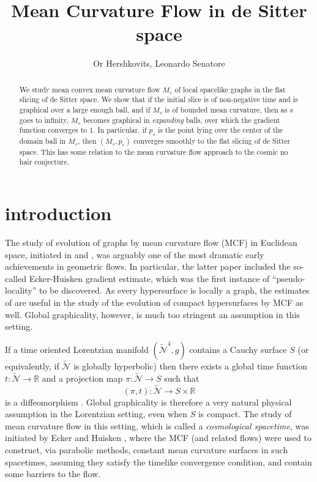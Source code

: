 \documentclass[leqno,11pt]{amsart}
\title[Mean curvature flow in de Sitter space]{Mean Curvature Flow  in de Sitter space}
\author{Or Hershkovits, Leonardo Senatore}
\theoremstyle{definition}
\begin{document}
\begin{abstract}
We study mean convex mean curvature flow $M_s$ of local spacelike graphs in the flat slicing of de Sitter space. We show that if the initial slice is  of non-negative time  and is graphical over a large enough ball,  and if $M_s$ is of  bounded mean curvature, then as $s$ goes to infinity, $M_s$ becomes graphical  in \textit{expanding} balls, over which the gradient function converges to $1$. In particular, if $p_s$ is the point lying over the center of the domain ball in $M_s$, then $(M_s,p_s)$ converges smoothly  to the flat slicing of de Sitter space. This has some relation to the mean curvature flow approach to the cosmic no hair conjecture.
\end{abstract}

\maketitle

\section{introduction}

The study of evolution of graphs by mean curvature flow (MCF) in Euclidean space, initiated in \cite{EH_entire} and \cite{EH_interior}, was arguably one of the most dramatic early achievements in geometric flows. In particular, the latter paper included the so-called Ecker-Huisken gradient estimate, which was the first instance of ``pseudo-locality'' to be discovered. As every hypersurface is locally a graph, the estimates of \cite{EH_interior} are  useful in the study of the evolution of compact hypersurfaces by MCF as well. Global graphicality, however, is much too stringent an assumption in this setting.  

\bigskip

If a time oriented Lorentzian manifold $(\tilde{\mathcal{N}}^4,g)$ contains a  Cauchy surface $S$ (or equivalently, if $\tilde{\mathcal{N}}$ is globally hyperbolic) then there exists a global time function $t:\tilde{\mathcal{N}}\rightarrow \mathbb{R}$ and a projection map $\pi:\tilde{\mathcal{N}}\rightarrow S$ such that 
\[
(\pi,t):\tilde{\mathcal{N}}\rightarrow S \times \mathbb{R}
\]  
is a diffeomorphism \cite{Geroch, Hawking_Ellis, BS}. Global graphicality is therefore a very natural physical assumption in the Lorentzian setting, even when $S$ is compact. The study of mean curvature flow in this setting, which is called a \textit{cosmological spacetime}, was initiated by Ecker and Huisken \cite{Ecker_Huisken_lor}, where the MCF (and related flows) were used to construct, via parabolic methods, { constant mean curvature} surfaces in such spacetimes, assuming they satisfy the timelike convergence condition, and contain some barriers to the flow.  
\end{document}
